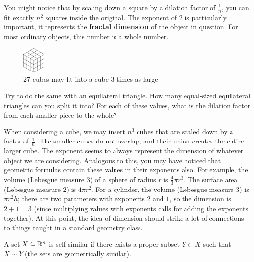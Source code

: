 You might notice that by scaling down a square by a dilation factor of $\frac{1}{n}$, you can fit exactly $n^2$ squares inside the original. The exponent of $2$ is particularly important, it represents the \textbf{fractal dimension} of the object in question. For most ordinary objects, this number is a whole number. \\

\begin{figure}
  \begin{center}
    \includegraphics[width=0.1\textwidth]{Images/1.4.2.png}
  \end{center}
  \caption{27 cubes may fit into a cube 3 times as large}
\end{figure}

\begin{exercise}
    Try to do the same with an equilateral triangle. How many equal-sized equilateral triangles can you split it into? For each of these values, what is the dilation factor from each smaller piece to the whole? 
\end{exercise}



When considering a cube, we may insert $n^3$ cubes that are scaled down by a factor of $\frac{1}{n}$. The smaller cubes do not overlap, and their union creates the entire larger cube. The exponent seems to always represent the dimension of whatever object we are considering. Analogous to this, you may have noticed that geometric formulas contain these values in their exponents also. For example, the volume (Lebesgue measure 3) of a sphere of radius $r$ is $\frac{4}{3}\pi r^3$. The surface area (Lebesgue measure 2) is $4\pi r^2$. For a cylinder, the volume (Lebesgue measure 3) is $\pi r^2 h$; there are two parameters with exponents $2$ and $1$, so the dimension is $2+1=3$ (since multiplying values with exponents calls for adding the exponents together). At this point, the idea of dimension should strike a lot of connections to things taught in a standard geometry class. 

\clearpage

\begin{definition}
    A set $X\subseteq \mathbb{R}^n$ is self-similar if there exists a proper subset $Y\subset X$ such that $X \sim Y$ (the sets are geometrically similar).
\end{definition}

